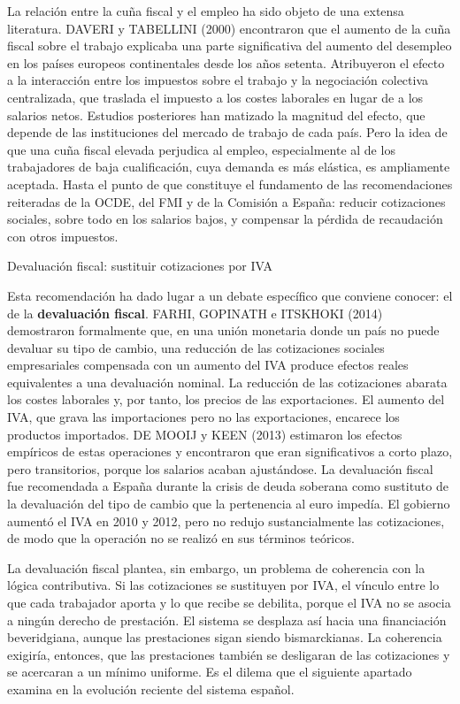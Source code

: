\documentclass[10pt,a4paper]{article}
\begin{document}
La relación entre la cuña fiscal y el empleo ha sido objeto de una extensa literatura. DAVERI y TABELLINI (2000) encontraron que el aumento de la cuña fiscal sobre el trabajo explicaba una parte significativa del aumento del desempleo en los países europeos continentales desde los años setenta. Atribuyeron el efecto a la interacción entre los impuestos sobre el trabajo y la negociación colectiva centralizada, que traslada el impuesto a los costes laborales en lugar de a los salarios netos. Estudios posteriores han matizado la magnitud del efecto, que depende de las instituciones del mercado de trabajo de cada país. Pero la idea de que una cuña fiscal elevada perjudica al empleo, especialmente al de los trabajadores de baja cualificación, cuya demanda es más elástica, es ampliamente aceptada. Hasta el punto de que constituye el fundamento de las recomendaciones reiteradas de la OCDE, del FMI y de la Comisión a España: reducir cotizaciones sociales, sobre todo en los salarios bajos, y compensar la pérdida de recaudación con otros impuestos.

Devaluación fiscal: sustituir cotizaciones por IVA

Esta recomendación ha dado lugar a un debate específico que conviene conocer: el de la \textbf{devaluación fiscal}. FARHI, GOPINATH e ITSKHOKI (2014) demostraron formalmente que, en una unión monetaria donde un país no puede devaluar su tipo de cambio, una reducción de las cotizaciones sociales empresariales compensada con un aumento del IVA produce efectos reales equivalentes a una devaluación nominal. La reducción de las cotizaciones abarata los costes laborales y, por tanto, los precios de las exportaciones. El aumento del IVA, que grava las importaciones pero no las exportaciones, encarece los productos importados. DE MOOIJ y KEEN (2013) estimaron los efectos empíricos de estas operaciones y encontraron que eran significativos a corto plazo, pero transitorios, porque los salarios acaban ajustándose. La devaluación fiscal fue recomendada a España durante la crisis de deuda soberana como sustituto de la devaluación del tipo de cambio que la pertenencia al euro impedía. El gobierno aumentó el IVA en 2010 y 2012, pero no redujo sustancialmente las cotizaciones, de modo que la operación no se realizó en sus términos teóricos.

La devaluación fiscal plantea, sin embargo, un problema de coherencia con la lógica contributiva. Si las cotizaciones se sustituyen por IVA, el vínculo entre lo que cada trabajador aporta y lo que recibe se debilita, porque el IVA no se asocia a ningún derecho de prestación. El sistema se desplaza así hacia una financiación beveridgiana, aunque las prestaciones sigan siendo bismarckianas. La coherencia exigiría, entonces, que las prestaciones también se desligaran de las cotizaciones y se acercaran a un mínimo uniforme. Es el dilema que el siguiente apartado examina en la evolución reciente del sistema español.
\end{document}
